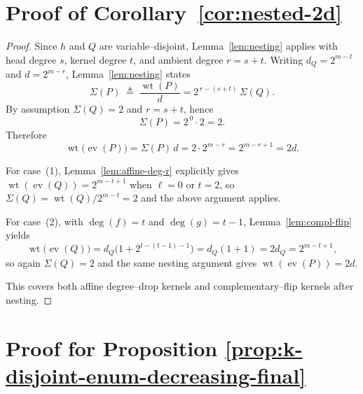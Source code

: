 \documentclass[conference]{IEEEtran}
\theoremstyle{definition}
\newcommand{\wt}{\operatorname{wt}}
\newcommand{\ev}{\operatorname{ev}}
\begin{document}
\section{Proof of Corollary~\ref{cor:nested-2d}}

\begin{proof}
Since $h$ and $Q$ are variable–disjoint, Lemma~\ref{lem:nesting}
applies with head degree $s$, kernel degree $t$, and ambient degree
$r=s+t$. Writing $d_Q=2^{m-t}$ and $d=2^{m-r}$, Lemma~\ref{lem:nesting}
states
\[
\Sigma(P)
\;\triangleq\;
\frac{\wt(P)}{d}
=
2^{\,r-(s+t)}\,\Sigma(Q).
\]
By assumption $\Sigma(Q)=2$ and $r=s+t$, hence
\[
\Sigma(P) = 2^{\,0}\cdot 2 = 2.
\]
Therefore
\[
\wt\bigl(\ev(P)\bigr)
=
\Sigma(P)\,d
=
2\cdot 2^{m-r}
=
2^{m-r+1}
=
2d.
\]

For case~(1), Lemma~\ref{lem:affine-deg-r} explicitly gives
$\wt(\ev(Q))=2^{m-t+1}$ when $\ell=0$ or $t=2$, so
$\Sigma(Q)=\wt(Q)/2^{m-t}=2$ and the above argument applies.

For case~(2), with $\deg(f)=t$ and $\deg(g)=t-1$,
Lemma~\ref{lem:compl-flip} yields
\[
\wt\bigl(\ev(Q)\bigr)
=
d_Q\bigl(1+2^{t-(t-1)-1}\bigr)
=
d_Q(1+1)
=
2d_Q
=
2^{m-t+1},
\]
so again $\Sigma(Q)=2$ and the same nesting argument gives
$\wt(\ev(P))=2d$.

This covers both affine degree–drop kernels and complementary–flip
kernels after nesting.
\end{proof}


\section{Proof for Proposition \ref{prop:k-disjoint-enum-decreasing-final}}%
\end{document}
